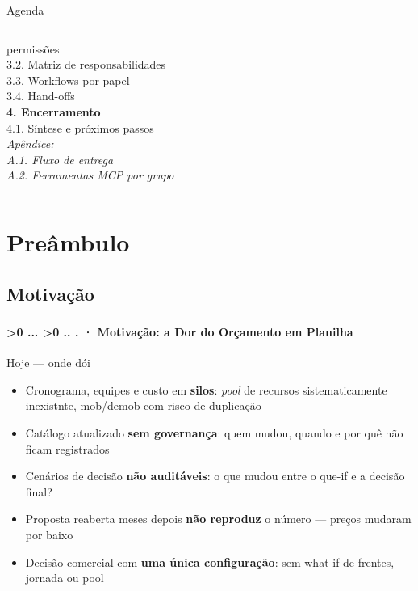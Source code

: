 \documentclass[aspectratio=169,10pt]{beamer}
\newcounter{mlc3}[subsection]
\newcounter{mlc4}[mlc3]
\newcommand{\pathnum}{%
  \ifnum\value{mlc4}>0
    \thesection.\thesubsection.\arabic{mlc3}.\arabic{mlc4}%
  \else\ifnum\value{mlc3}>0
    \thesection.\thesubsection.\arabic{mlc3}%
  \else
    \thesection.\thesubsection%
  \fi\fi
}
\newcommand{\mtitle}[1]{%
  \frametitle{\insertsection}%
  \framesubtitle{\pathnum\;·\; #1}}
\begin{document}
\begin{frame}{Agenda}
\begin{columns}[T]
{    \hspace*{10pt}permissões\\
    3.2. Matriz de responsabilidades\\
    3.3. Workflows por papel\\
    3.4. Hand-offs\\[12pt]}
    {\small\textbf{\textcolor{mlgreen}{4. Encerramento}}}\\[4pt]
    {\footnotesize
    4.1. Síntese e próximos passos\\[12pt]}
    {\footnotesize\itshape\textcolor{mlgray!40!black}{Apêndice:\\
    A.1. Fluxo de entrega\\
    A.2. Ferramentas MCP por grupo}}
  \end{columns}
\end{frame}

\section{Preâmbulo}

\subsection{Motivação}
\begin{frame}
  \mtitle{Motivação: a Dor do Orçamento em Planilha}
  \centering
  \begin{minipage}{0.72\textwidth}
    \begin{alertblock}{Hoje --- onde dói}
      \begin{itemize}
        \item Cronograma, equipes e custo em \textbf{silos}: \emph{pool} de
          recursos sistematicamente inexistnte, mob/demob com risco de duplicação
        \item Catálogo atualizado \textbf{sem governança}: quem mudou,
          quando e por quê não ficam registrados
        \item Cenários de decisão \textbf{não auditáveis}: o que mudou entre
          o que-if e a decisão final?
        \item Proposta reaberta meses depois \textbf{não reproduz} o
          número --- preços mudaram por baixo
        \item Decisão comercial com \textbf{uma única configuração}:
          sem what-if de frentes, jornada ou pool
      \end{itemize}
    \end{alertblock}
  \end{minipage}
\end{frame}
\end{document}
